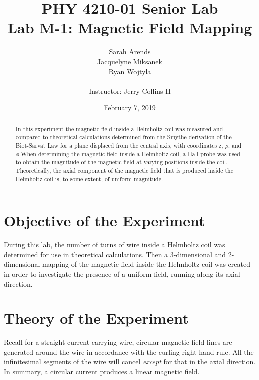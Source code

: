 \documentclass[a4paper]{article}
\title{PHY 4210-01 Senior Lab \\Lab M-1: Magnetic Field Mapping}
\author{Sarah Arends \\ 
        Jacquelyne Miksanek \\
        Ryan Wojtyla \\ \\
        Instructor: Jerry Collins II}
\date{February 7, 2019}
\begin{document}
\maketitle 

\begin{abstract}
  \qq In this experiment the magnetic field inside a Helmholtz coil was measured and
  compared to theoretical calculations determined from the Smythe derivation of
  the Biot-Sarvat Law for a plane displaced from the central axis, with
  coordinates z, $\rho$, and $\phi$.When determining the magnetic field inside a
  Helmholtz coil, a Hall probe was used to obtain the magnitude of the magnetic
  field at varying positions inside the coil. Theoretically, the axial component
  of the magnetic field that is produced inside the Helmholtz coil is, to some
  extent, of uniform magnitude.
\end{abstract}

\newpage

\tableofcontents

\newpage

\section{Objective of the Experiment}
\qq During this lab, the number of turns of wire inside a Helmholtz coil was
determined for use in theoretical calculations. Then a 3-dimensional and
2-dimensional mapping of the magnetic field inside the Helmholtz coil was
created in order to investigate the presence of a uniform field, running along
its axial direction.


\section{Theory of the Experiment}



\qq Recall for a straight current-carrying wire, circular magnetic field lines
are generated around the wire in accordance with the curling right-hand
rule. All the infinitesimal segments of the wire will cancel \textit{except} for
that in the axial direction. In summary, a circular current produces a linear
magnetic field.
\end{document}
